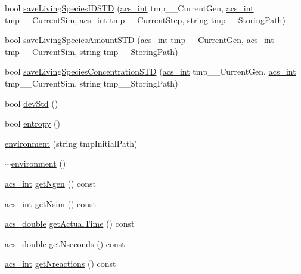 \begin{DoxyCompactItemize}
\item 
bool \hyperlink{a00013_a623c3cda23a18cb7b039c5a666408d72}{save\+Living\+Species\+I\+D\+S\+T\+D} (\hyperlink{a00050_a8d277355641a098190360234e2ebde35}{acs\+\_\+int} tmp\+\_\+\+\_\+\+Current\+Gen, \hyperlink{a00050_a8d277355641a098190360234e2ebde35}{acs\+\_\+int} tmp\+\_\+\+\_\+\+Current\+Sim, \hyperlink{a00050_a8d277355641a098190360234e2ebde35}{acs\+\_\+int} tmp\+\_\+\+\_\+\+Current\+Step, string tmp\+\_\+\+\_\+\+Storing\+Path)
\item 
bool \hyperlink{a00013_a26c70b0a84c37c87952628d4a328c238}{save\+Living\+Species\+Amount\+S\+T\+D} (\hyperlink{a00050_a8d277355641a098190360234e2ebde35}{acs\+\_\+int} tmp\+\_\+\+\_\+\+Current\+Gen, \hyperlink{a00050_a8d277355641a098190360234e2ebde35}{acs\+\_\+int} tmp\+\_\+\+\_\+\+Current\+Sim, string tmp\+\_\+\+\_\+\+Storing\+Path)
\item 
bool \hyperlink{a00013_aedf8d90e1fe734948bf2213489840582}{save\+Living\+Species\+Concentration\+S\+T\+D} (\hyperlink{a00050_a8d277355641a098190360234e2ebde35}{acs\+\_\+int} tmp\+\_\+\+\_\+\+Current\+Gen, \hyperlink{a00050_a8d277355641a098190360234e2ebde35}{acs\+\_\+int} tmp\+\_\+\+\_\+\+Current\+Sim, string tmp\+\_\+\+\_\+\+Storing\+Path)
\item 
bool \hyperlink{a00013_ae7fd21d14f81c4854b3a6163b0278857}{dev\+Std} ()
\item 
bool \hyperlink{a00013_a4e9b60ec8b05e888cf0e55def03ee906}{entropy} ()
\item 
\hyperlink{a00013_aa44bbabec52bf2d61a19685a30e68de1}{environment} (string tmp\+Initial\+Path)
\item 
\hyperlink{a00013_ae323954bd5b674bf34d954c3f7b67629}{$\sim$environment} ()
\item 
\hyperlink{a00050_a8d277355641a098190360234e2ebde35}{acs\+\_\+int} \hyperlink{a00013_afad68362d5f4ec0689941e3c1b92c2e8}{get\+Ngen} () const 
\item 
\hyperlink{a00050_a8d277355641a098190360234e2ebde35}{acs\+\_\+int} \hyperlink{a00013_a5a8522899b3e84b9c394d5d83d1e5c63}{get\+Nsim} () const 
\item 
\hyperlink{a00050_ab776853a005fcbf56af0424a2a4dd607}{acs\+\_\+double} \hyperlink{a00013_a14bad649a73246617361f0e1765f49f8}{get\+Actual\+Time} () const 
\item 
\hyperlink{a00050_ab776853a005fcbf56af0424a2a4dd607}{acs\+\_\+double} \hyperlink{a00013_aa850c2805e508b2aac4fbd5d5f9de77b}{get\+Nseconds} () const 
\item 
\hyperlink{a00050_a8d277355641a098190360234e2ebde35}{acs\+\_\+int} \hyperlink{a00013_a5cb9cf3968f19e23f6c54f4c915cf878}{get\+Nreactions} () const 

\end{DoxyCompactItemize}
